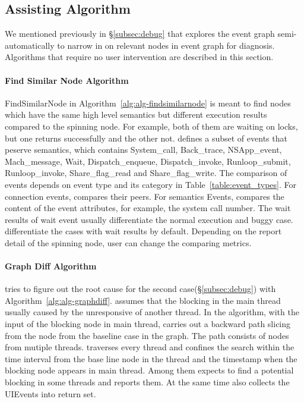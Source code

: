 \subsection{\xxx Assisting Algorithm}

We mentioned previously in \S\ref{subsec:debug} that \xxx explores the event
graph semi-automatically to narrow in on relevant nodes in event graph for
diagnosis. Algorithms that require no user intervention are described
in this section.

\paragraph{Find Similar Node Algorithm}

FindSimilarNode in Algorithm~\ref{alg:alg-findsimilarnode} is meant to find
nodes which have the same high level semantics but different execution results
compared to the spinning node. For example, both of them are waiting on locks,
but one returns successfully and the other not. \xxx defines a subset of events
that peserve semantics, which contains System\_call, Back\_trace, NSApp\_event,
Mach\_message, Wait, Dispatch\_enqueue, Dispatch\_invoke, Runloop\_submit,
Runloop\_invoke, Share\_flag\_read and Share\_flag\_write. The comparison of
events depends on event type and its category in Table~\ref{table:event_types}.
For connection events, \xxx compares their peers. For semantics Events, \xxx
compares the content of the event attributes, for example, the system call
number. The wait results of wait event usually differentiate the normal
execution and buggy case. \xxx differentiate the cases with wait results by
default. Depending on the report detail of the spinning node, user can change
the comparing metrics.

\paragraph{Graph Diff Algorithm}

\xxx tries to figure out the root cause for the second
case(\S\ref{subsec:debug}) with Algorithm~\ref{alg:alg-graphdiff}. \xxx assumes
that the blocking in the main thread usually caused by the unresponsive of
another thread. In the algorithm, with the input of the blocking node in main
thread, \xxx carries out a backward path slicing from the node from the baseline
case in the graph. The path consists of nodes from mutiple threads. \xxx
traverses every thread and confines the search within the time interval from the
base line node in the thread and the timestamp when the blocking node appears
in main thread. Among them \xxx expects to find a potential blocking in some
threads and reports them. At the same time \xxx also collects the UIEvents into
return set.

